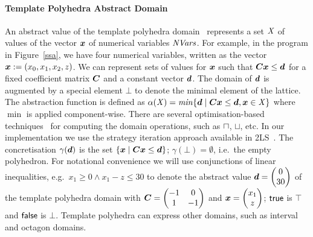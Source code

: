 \paragraph{Template Polyhedra Abstract Domain}
%
An abstract value of the template polyhedra domain~\cite{sriram}
represents a set $\mathit{X}$ of values of the vector ${\boldsymbol {x}}$ of numerical variables $\mathit{NVars}$. For
example, in the program in Figure~\ref{ssa}, we have four numerical
variables, written as the vector ${\boldsymbol {x}}:=(x_0,x_1,x_2,z)$.  We can
represent sets of values for ${\boldsymbol {x}}$ such that
${\boldsymbol C}{\boldsymbol {x}}\leq{\boldsymbol {d}}$ for a fixed coefficient matrix ${\boldsymbol C}$
and a constant vector ${\boldsymbol {d}}$. The domain of ${\boldsymbol {d}}$ is augmented
by a special element $\bot$ to denote the minimal element of the
lattice.
%
The abstraction function is defined as $\alpha(\mathit{X}) = \mathit{min} \{{\boldsymbol {d}}\mid
{\boldsymbol C}{\boldsymbol {x}}\leq{\boldsymbol {d}}, {\boldsymbol {x}}\in \mathit{X}\}$ where $\min$ is applied
component-wise. There are several optimisation-based
techniques~\cite{sriram,GS07b,BJKS15} for computing the domain
operations, such as $\sqcap$, $\sqcup$, etc. In our implementation we
use the strategy iteration approach available in 2LS~\cite{BJKS15}.
%
The concretisation $\gamma({\boldsymbol {d}})$ is the set $\{{\boldsymbol {x}}\mid
{\boldsymbol C}{\boldsymbol {x}}\leq{\boldsymbol {d}}\}$; $\gamma(\bot)=\emptyset$, i.e.\ the empty polyhedron.
%
For notational convenience we will use conjunctions of linear
inequalities, e.g.\ $x_1\geq 0 \wedge x_1-z\leq 30$ to denote the
abstract value $\vec{\numabsval}=\vecv{0}{30}$ of the template polyhedra domain
with $\mat{C}=\qmat{-1}{0}{1}{-1}$ and $\vec{\numvar}=\vecv{x_1}{z}$;
$\mathsf{true}$ is $\top$ and $\mathsf{false}$ is $\bot$.  Template polyhedra can
express other domains, such as interval and octagon domains.

